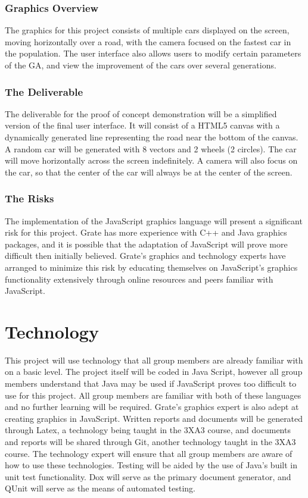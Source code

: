 \documentclass{article}
\begin{document}
\subsubsection{Graphics Overview}
The graphics for this project consists of multiple cars displayed on the screen, 
moving horizontally over a road, with the camera focused on the fastest car in 
the population. The user interface also allows users to modify certain 
parameters of the GA, and view the improvement of the cars over several 
generations. 

\subsubsection{The Deliverable}
The deliverable for the proof of concept demonstration will be a simplified 
version of the final user interface. It will consist of a HTML5 canvas with a 
dynamically generated line representing the road near the bottom of the canvas. 
A random car will be generated with \textcolor{RoyalPurple}{8} vectors and 2 wheels (2 
circles). The car will move horizontally across the screen indefinitely. A 
camera will also focus on the car, so that the center of the car will always be 
at the center of the screen.

\subsubsection{The Risks}
The implementation of the JavaScript graphics language will present a 
significant risk for this project. Grate has more experience with C++ and Java 
graphics packages, and it is possible that the adaptation of JavaScript will 
prove more difficult then initially believed. \textcolor{RoyalPurple}{Grate's} graphics and technology 
experts have arranged to minimize this risk by educating themselves on 
JavaScript's graphics functionality extensively through online resources and 
peers familiar with JavaScript.

\section{Technology}

This project will use technology that all group members are already familiar 
with on a basic level. The project itself will be coded in Java Script, however 
all group members understand that Java may be used if JavaScript proves too 
difficult to use for this project. All group members are familiar with both of 
these languages and no further learning will be required. \textcolor{RoyalPurple}{Grate's} graphics 
expert is also adept at creating graphics in JavaScript. Written reports and 
documents will be generated through Latex, a technology being taught in the 3XA3 
course, and documents and reports will be shared through Git, another technology taught in the 3XA3 course. The technology expert will ensure that all 
group members are aware of how to use these technologies. Testing will be aided 
by the use of Java’s built in unit test functionality. Dox will serve as the 
primary document generator, and QUnit will serve as the means of automated 
testing.
\end{document}
